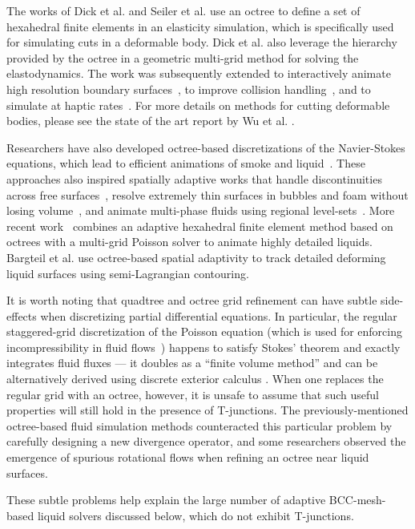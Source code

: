 The works of Dick et al. \cite{Dick2011} and Seiler et al. \cite{Seiler2011} use an octree to define a set of hexahedral finite elements in an elasticity simulation, which is specifically used for simulating cuts in a deformable body. Dick et al. also leverage the hierarchy provided by the octree in a geometric multi-grid method for solving the elastodynamics.
The work was subsequently extended to interactively animate high resolution boundary surfaces~\cite{Wu2011}, to improve collision handling~\cite{Wu2013}, and to simulate at haptic rates~\cite{Wu2014}. For more details on methods for cutting deformable bodies, please see the state of the art report by Wu et al. \cite{Wu2015}.

Researchers have also developed octree-based discretizations of the Navier-Stokes equations, which lead to efficient animations of smoke and liquid~\cite{Shi2004,Losasso2004,Losasso2005}.
These approaches also inspired spatially adaptive works that handle discontinuities across free surfaces~\cite{Hong2005}, resolve extremely thin surfaces in bubbles and foam without losing volume~\cite{Kim2007}, and animate multi-phase fluids using regional level-sets~\cite{Kim2010MultiPhase}. More recent work~\cite{Ferstl2014} combines an adaptive hexahedral finite element method based on octrees with a multi-grid Poisson solver to animate highly detailed liquids. Bargteil et al. \cite{Bargteil2006} use octree-based spatial adaptivity to track detailed deforming liquid surfaces using semi-Lagrangian contouring.

It is worth noting that quadtree and octree grid refinement can have subtle side-effects when discretizing partial differential equations. In particular, the regular staggered-grid discretization of the Poisson equation (which is used for enforcing incompressibility in fluid flows~\cite{Bridson2008}) happens to satisfy Stokes' theorem and exactly integrates fluid fluxes --- it doubles as a ``finite volume method'' and can be alternatively derived using discrete exterior calculus \cite{Crane:2013:DGP}. When one replaces the regular grid with an octree, however, it is unsafe to assume that such useful properties will still hold in the presence of T-junctions. The previously-mentioned octree-based fluid simulation methods counteracted this particular problem by carefully designing a new divergence operator, and some researchers observed the emergence of spurious rotational flows when refining an octree near liquid surfaces. 

These subtle problems help explain the large number of adaptive BCC-mesh-based liquid solvers discussed below, which do not exhibit T-junctions.

